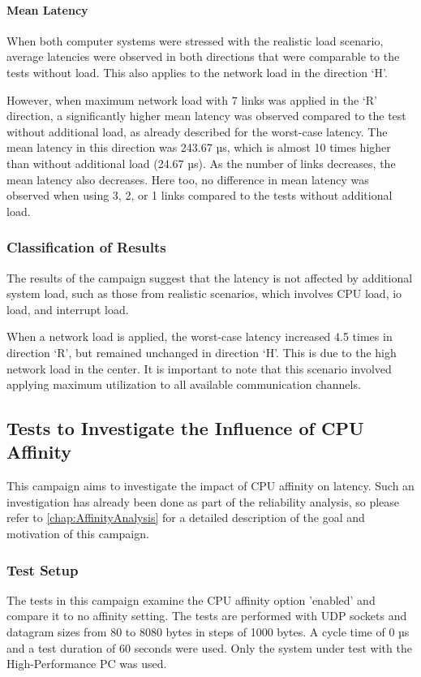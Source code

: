 \paragraph{Mean Latency}
When both computer systems were stressed with the realistic load scenario, average latencies were observed in both directions that were comparable to the tests without load. This also applies to the network load in the direction `H'.

However, when maximum network load with 7 links was applied in the `R' direction, a significantly higher mean latency was observed compared to the test without additional load, as already described for the worst-case latency. The mean latency in this direction was 243.67 µs, which is almost 10 times higher than without additional load (24.67 µs). As the number of links decreases, the mean latency also decreases. Here too, no difference in mean latency was observed when using 3, 2, or 1 links compared to the tests without additional load.

\subsubsection{Classification of Results}
The results of the campaign suggest that the latency is not affected by additional system load, such as those from realistic scenarios, which involves \ac{CPU} load, \ac{io} load, and interrupt load.

When a network load is applied, the worst-case latency increased 4.5 times in direction `R', but remained unchanged in direction `H'. This is due to the high network load in the center. It is important to note that this scenario involved applying maximum utilization to all available communication channels.

\subsection{Tests to Investigate the Influence of CPU Affinity}
This campaign aims to investigate the impact of \ac{CPU} affinity on latency. Such an investigation has already been done as part of the reliability analysis, so please refer to \ref{chap:AffinityAnalysis} for a detailed description of the goal and motivation of this campaign.

\subsubsection{Test Setup}
The tests in this campaign examine the \ac{CPU} affinity option 'enabled' and compare it to no affinity setting. The tests are performed with UDP sockets and datagram sizes from 80 to 8080 bytes in steps of 1000 bytes. A cycle time of 0 µs and a test duration of 60 seconds were used. Only the system under test with the High-Performance PC was used.

